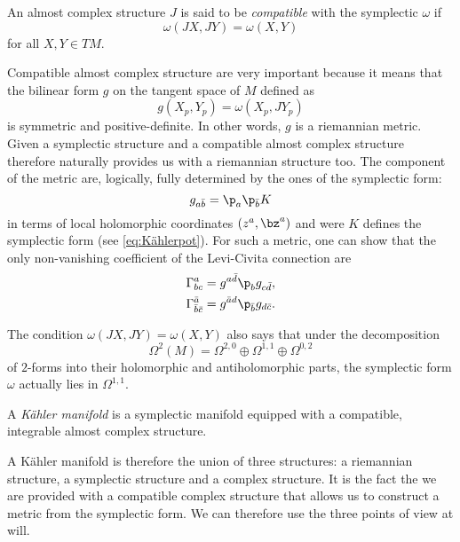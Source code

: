 \documentclass{worksheetclass}
\begin{document}
        \begin{defn}
            An almost complex structure $J$ is said to be \emph{compatible} with the symplectic $\omega$ if 
            \begin{equation*}
                \omega(JX,JY) = \omega(X,Y)
            \end{equation*}
            for all $X,Y\in TM$.
        \end{defn}
        Compatible almost complex structure are very important because it means that the bilinear form $g$ on the tangent space of $M$ defined as
        \begin{equation}
            g(X_p,Y_p)=\omega(X_p,JY_p)
        \end{equation}
        is symmetric and positive-definite. In other words, $g$ is a riemannian metric. Given a symplectic structure and a compatible almost complex structure therefore naturally provides us with a riemannian structure too. The component of the metric are, logically, fully determined by the ones of the symplectic form:
        \begin{equation}
            g_{a\bar{b}}=\p_a\p_{\bar{b}}K
        \end{equation}
        in terms of local holomorphic coordinates $(z^a,\bz^a)$ and were $K$ defines the symplectic form (see \eqref{eq:Kählerpot}). For such a metric, one can show that the only non-vanishing coefficient of the Levi-Civita connection are
        \begin{align}
            \Gamma^a_{bc} &= g^{a\bar{d}}\p_bg_{c\bar{d}},\\
            \Gamma^{\bar{a}}_{\bar{b}\bar{c}} &= g^{\bar{a}d}\p_{\bar{b}}g_{d\bar{c}}.
        \end{align}
        
        The condition $\omega(JX,JY)=\omega(X,Y)$ also says that under the decomposition
        \begin{equation}
            \Omega^2(M) = \Omega^{2,0}\oplus\Omega^{1,1}\oplus\Omega^{0,2}
        \end{equation}
        of $2$-forms into their holomorphic and antiholomorphic parts, the symplectic form $\omega$ actually lies in $\Omega^{1,1}$.
    
        \begin{defn}
            A \emph{Kähler manifold} is a symplectic manifold equipped with a compatible, integrable almost complex structure.
        \end{defn}
        A Kähler manifold is therefore the union of three structures: a riemannian structure, a symplectic structure and a complex structure. It is the fact the we are provided with a compatible complex structure that allows us to construct a metric from the symplectic form. We can therefore use the three points of view at will.
        
\end{document}
